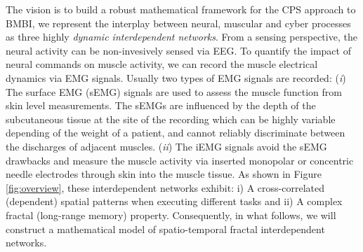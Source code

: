 The vision is to build a robust mathematical framework for the CPS approach to BMBI, we represent the interplay between neural, muscular and cyber processes as three highly \textit{dynamic interdependent networks}. From a sensing perspective, the neural activity can be non-invesively sensed via EEG. To quantify the impact of neural commands on muscle activity, we can record the muscle electrical dynamics via EMG signals. Usually two types of EMG signals are recorded: (\textit{i}) The surface EMG (sEMG) signals are used to assess the muscle function from skin level measurements. The sEMGs are influenced by the depth of the subcutaneous tissue at the site of the recording which can be highly variable depending of the weight of a patient, and cannot reliably discriminate between the discharges of adjacent muscles. (\textit{ii}) The iEMG signals avoid the sEMG drawbacks and measure the muscle activity via inserted monopolar or concentric needle electrodes through skin into the muscle tissue. As shown in Figure \ref{fig:overview}, these interdependent networks exhibit: i) A cross-correlated (dependent) spatial patterns when executing different tasks and ii) A complex fractal (long-range memory) property. Consequently, in what follows, we will construct a mathematical model of spatio-temporal fractal interdependent networks.      

